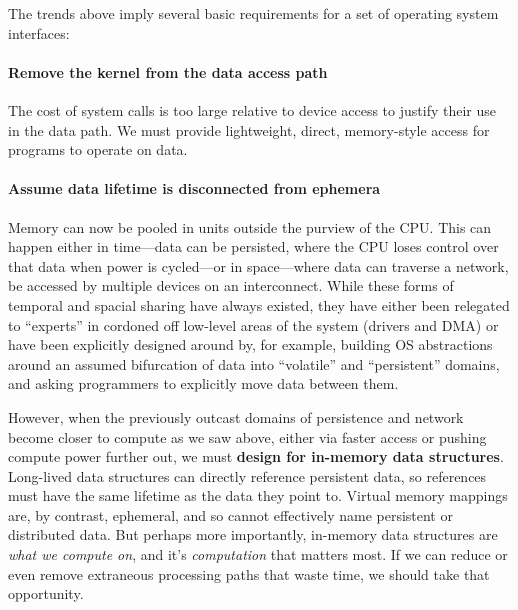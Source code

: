 \begin{chconc}

    The trends above imply several basic requirements for a set of operating system interfaces:

    \paragraph{Remove the kernel from the data access path} The cost of system calls is too large relative to device
    access to justify their use in the data path. We must provide lightweight, direct, memory-style access for
    programs to operate on data.

    \paragraph{Assume data lifetime is disconnected from ephemera} Memory can now be pooled in units outside the
    purview of the CPU. This can happen either in time---data can be persisted, where the CPU loses control over that
    data when power is cycled---or in space---where data can traverse a network, be accessed by
    multiple devices on an interconnect. While these forms of temporal and spacial sharing have always existed, they
    have either been relegated to ``experts'' in cordoned off low-level areas of the system (drivers and DMA) or have
    been explicitly designed around by, for example, building OS abstractions around an assumed bifurcation of data into
    ``volatile'' and ``persistent'' domains, and asking programmers to explicitly move data between
    them.

    However, when the previously outcast
    domains of persistence and network become closer to compute as we saw above, either via faster access or pushing compute power
    further out, we must \textbf{design for in-memory data structures}. Long-lived data structures can directly reference
    persistent data, so references must have the same lifetime as the data they point to. Virtual memory mappings are, by
    contrast, ephemeral, and so cannot effectively name persistent or distributed data. But perhaps more importantly,
    in-memory data structures are \emph{what we compute on}, and it's \emph{computation} that matters most. If we can reduce
    or even remove extraneous processing paths that waste time, we should take that opportunity.



\end{chconc}

